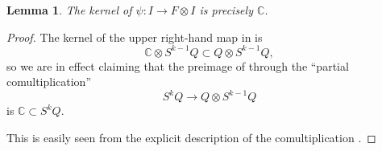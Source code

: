 \documentclass[11pt]{article}
\theoremstyle{plain}
\newtheorem{lemma}{Lemma}[section]
\theoremstyle{nonumberplain}
\theoremstyle{plain}
\numberwithin{equation}{section}
\theoremstyle{nonumberplain}
\newtheorem{proof}{Proof}
\newcommand\bC{{\mathbb C}}
\newcommand\1{{\bf 1}}
\DeclareMathOperator{\id}{id}
\begin{document}



\begin{lemma}\label{le.correct-ker}
  The kernel of $\psi:I\to F\otimes I$ is precisely $\bC$.
\end{lemma}
\begin{proof}
  The kernel of the upper right-hand map in  is
  \begin{equation}\label{eq:ck-1}
   \mathbb{C}\otimes S^{k-1}Q\subset Q\otimes S^{k-1}Q,
  \end{equation}
  so we are in effect claiming that the preimage of  through the ``partial comultiplication''
  \begin{equation}\label{eq:partdelta}
    S^kQ\to Q\otimes S^{k-1}Q
  \end{equation}
  is $\bC\subset S^kQ$.

  This is easily seen from the explicit description  of the comultiplication .
\end{proof}  
\end{document}
